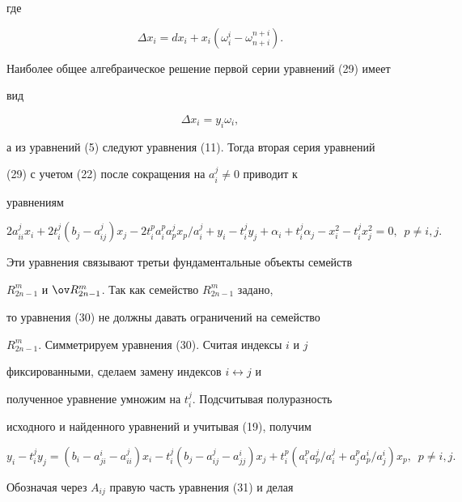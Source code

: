 где 


$$ 


\Delta x_i=dx_i+x_i(\omega^i_i-\omega^{n+i}_{n+i}). 


$$ 


Наиболее общее алгебраическое решение первой серии уравнений (29) имеет 


вид 


$$ 


\Delta x_i=y_i\omega_i, 


$$ 


а из уравнений (5) следуют уравнения (11). Тогда вторая серия уравнений 


(29) с учетом (22) после сокращения на $a^j_i\ne0$ приводит к 


уравнениям 


\begin{equation} 


2a^j_{ii}x_i+2t^j_i(b_j-a^j_{ij})x_j-2t^p_i a^p_i a^j_p 


x_p/a^j_i+y_i-t^j_i y_j+\alpha_i+t^j_i\alpha_j- 


x^2_i-t^j_i x^2_j=0,\ \; p\ne i,j. 


\end{equation} 


Эти уравнения связывают третьи фундаментальные объекты семейств 


$R^m_{2n-1}$ и $\ov R^m_{2n-1}$. Так как семейство $R^m_{2n-1}$ задано, 


то уравнения (30) не должны давать ограничений на семейство 


$R^m_{2n-1}$. Симметрируем уравнения (30). Считая индексы $i$ и $j$ 


фиксированными, сделаем замену индексов $i\leftrightarrow j$ и 


полученное уравнение умножим на $t^j_i$. Подсчитывая полуразность 


исходного и найденного уравнений и учитывая (19), получим 


\begin{equation} 


y_i-t^j_i y_j=(b_i-a^i_{ji}-a^j_{ii})x_i-t^j_i 


(b_j-a^j_{ij}-a^i_{jj})x_j+t^p_i(a^p_i a^j_p/a^j_i+ 


a^p_j a^i_p/a^i_j)x_p,\ \; p\ne i,j. 


\end{equation} 


Обозначая через $A_{ij}$ правую часть уравнения (31) и делая 


